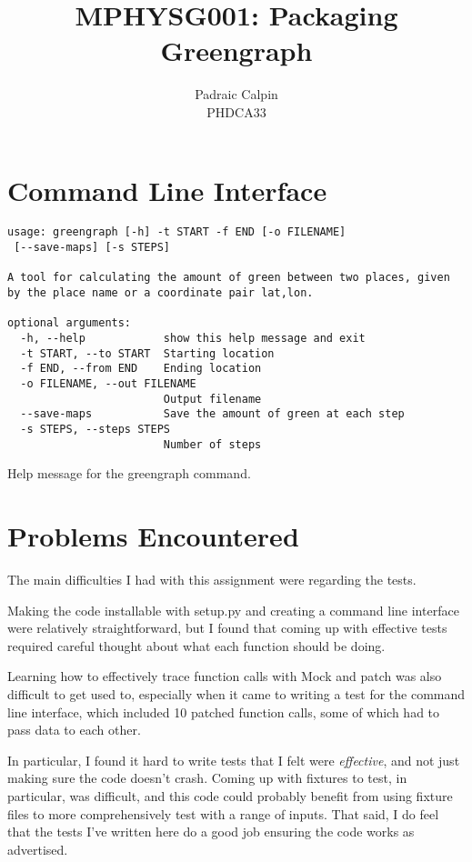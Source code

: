 \documentclass[12pt,a4paper]{article}
\begin{document}
\title{MPHYSG001: Packaging Greengraph}
\author{Padraic Calpin \\ PHDCA33}
\maketitle

\section*{Command Line Interface}
\begin{listing*}
\begin{verbatim}
usage: greengraph [-h] -t START -f END [-o FILENAME]
 [--save-maps] [-s STEPS]

A tool for calculating the amount of green between two places, given 
by the place name or a coordinate pair lat,lon.

optional arguments:
  -h, --help            show this help message and exit
  -t START, --to START  Starting location
  -f END, --from END    Ending location
  -o FILENAME, --out FILENAME
                        Output filename
  --save-maps           Save the amount of green at each step
  -s STEPS, --steps STEPS
                        Number of steps
\end{verbatim}
\caption{Help message for the greengraph command.}
\end{listing*}

\section*{Problems Encountered}
The main difficulties I had with this assignment were regarding the tests. 

Making the code installable with setup.py and creating a command line interface were relatively straightforward, but I found that coming up with effective tests required careful thought about what each function should be doing. 

Learning how to effectively trace function calls with Mock and patch was also difficult to get used to, especially when it came to writing a test for the command line interface, which included 10 patched function calls, some of which had to pass data to each other. 

In particular, I found it hard to write tests that I felt were \textit{effective}, and not just making sure the code doesn't crash. Coming up with fixtures to test, in particular, was difficult, and this code could probably benefit from using fixture files to more comprehensively test with a range of inputs. That said, I do feel that the tests I've written here do a good job ensuring the code works as advertised. 
\end{document}
